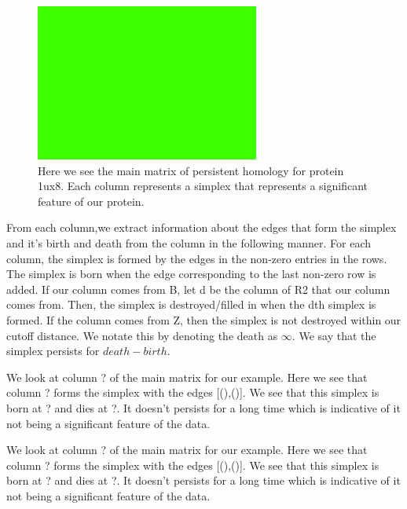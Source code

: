 \documentclass[12pt, a4paper, twocolumn, fullpage]{article}
\theoremstyle{plain}
\theoremstyle{definition}
\theoremstyle{remark}
\begin{document}
\begin{figure}[t]
    \includegraphics[width=\linewidth]{img/blank.png}
    \caption{Here we see the main matrix of persistent homology for protein 1ux8. Each column represents a simplex that represents a significant feature of our protein.}
    \label{1ux8MainMatrix}
\end{figure}

From each column,we extract information about the edges that form the simplex and it's birth and death from the column in the following manner. For each column, the simplex is formed by the edges in the non-zero entries in the rows. The simplex is born when the edge corresponding to the last non-zero row is added. If our column comes from B, let d be the column of R2 that our column comes from. Then, the simplex is destroyed/filled in when the dth simplex is formed. If the column comes from Z, then the simplex is not destroyed within our cutoff distance. We notate this by denoting the death as $\infty$. We say that the simplex persists for $death - birth$.

We look at column ? of the main matrix for our example. Here we see that column ? forms the simplex with the edges [(),()]. We see that this simplex is born at ? and dies at ?. It doesn't persists for a long time which is indicative of it not being a significant feature of the data.

We look at column ? of the main matrix for our example. Here we see that column ? forms the simplex with the edges [(),()]. We see that this simplex is born at ? and dies at ?. It doesn't persists for a long time which is indicative of it not being a significant feature of the data.
\end{document}
